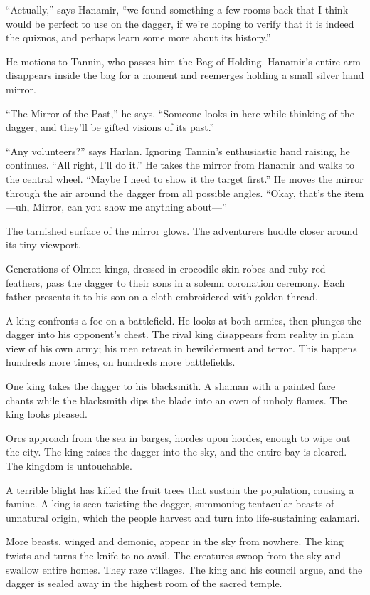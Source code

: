 \documentclass[smalldemyvopaper,11pt,twoside,onecolumn,openright,extrafontsizes]{memoir}
\begin{document}
``Actually,'' says Hanamir, ``we found something a few rooms back that I
think would be perfect to use on the dagger, if we're hoping to verify
that it is indeed the quiznos, and perhaps learn some more about its
history.''

He motions to Tannin, who passes him the Bag of Holding. Hanamir's
entire arm disappears inside the bag for a moment and reemerges holding
a small silver hand mirror.

``The Mirror of the Past,'' he says. ``Someone looks in here while
thinking of the dagger, and they'll be gifted visions of its past.''

``Any volunteers?'' says Harlan. Ignoring Tannin's enthusiastic hand
raising, he continues. ``All right, I'll do it.'' He takes the mirror
from Hanamir and walks to the central wheel. ``Maybe I need to show it
the target first.'' He moves the mirror through the air around the
dagger from all possible angles. ``Okay, that's the item---uh, Mirror,
can you show me anything about---''

The tarnished surface of the mirror glows. The adventurers huddle closer
around its tiny viewport.

Generations of Olmen kings, dressed in crocodile skin robes and ruby-red
feathers, pass the dagger to their sons in a solemn coronation ceremony.
Each father presents it to his son on a cloth embroidered with golden
thread.

A king confronts a foe on a battlefield. He looks at both armies, then
plunges the dagger into his opponent's chest. The rival king disappears
from reality in plain view of his own army; his men retreat in
bewilderment and terror. This happens hundreds more times, on hundreds
more battlefields.

One king takes the dagger to his blacksmith. A shaman with a painted
face chants while the blacksmith dips the blade into an oven of unholy
flames. The king looks pleased.

Orcs approach from the sea in barges, hordes upon hordes, enough to wipe
out the city. The king raises the dagger into the sky, and the entire
bay is cleared. The kingdom is untouchable.

A terrible blight has killed the fruit trees that sustain the
population, causing a famine. A king is seen twisting the dagger,
summoning tentacular beasts of unnatural origin, which the people
harvest and turn into life-sustaining calamari.

More beasts, winged and demonic, appear in the sky from nowhere. The
king twists and turns the knife to no avail. The creatures swoop from
the sky and swallow entire homes. They raze villages. The king and his
council argue, and the dagger is sealed away in the highest room of the
sacred temple.
\end{document}
